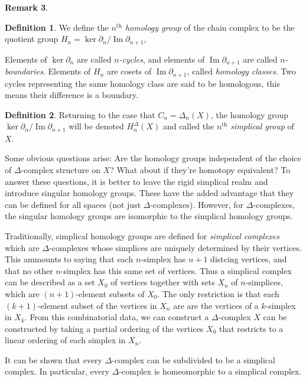\documentclass[11pt,a4paper]{article}
\theoremstyle{definition}
\newtheorem{definition}{Definition}[section]
\newtheorem{remark}[definition]{Remark}
\theoremstyle{plain}
\theoremstyle{remark}
\begin{document}
\begin{remark}
\begin{definition}
  We define the \emph{$n^\operatorname{th}$ homology group} of the chain complex 
  to be the quotient group $H_n = \ker \partial_n / \operatorname{Im} \partial_{n+1}$,
\end{definition}

Elements of $\ker \partial_n$ are called \emph{$n$-cycles}, and elements of $\operatorname{Im} \partial_{n+1}$ are called 
\emph{$n$-boundaries}. Elements of $H_n$ are cosets of $\operatorname{Im} \partial_{n+1}$, 
called \emph{homology classes}. Two cycles representing the same homology class are said to be 
homologous, this means their difference is a boundary. 

\begin{definition}
  Returning to the case that $C_n = \Delta_n (X)$, the homology group $\ker \partial_n / \operatorname{Im} \partial_{n+1}$ will 
  be denoted $H_n^\Delta (X)$ and called the \emph{$n^\operatorname{th}$ simplical group} of $X$. 
\end{definition}

Some obvious questions arise: Are the homology groups independent of the 
choice of $\Delta$-complex structure on $X$? What about if they're homotopy equivalent? 
To answer these questions, it is better to leave the rigid simplical realm and 
introduce singular homology groups. 
These have the added advantage that they can be defined for all spaces (not just $\Delta$-complexes). 
However, for $\Delta$-complexes, the singular homology groups are isomorphic to the simplical homology groups.

Traditionally, simplical homology groups are defined for \emph{simplical complexes} which are
$\Delta$-complexes whose simplices are uniquely determined by their vertices. 
This ammounts to saying that each $n$-simplex has $n+1$ distcing vertices, and that 
no other $n$-simplex has this same set of vertices. Thus a simplical complex can be described 
as a set $X_0$ of vertices together with sets $X_n$ of $n$-simplices, 
which are $(n+1)$-element subsets of $X_0$. 
The only restriction is that each $(k+1)$-element subset of the vertices in $X_n$ are 
are the vertices of a $k$-simplex in $X_k$. From this combinatorial data, we 
can construct a $\Delta$-complex $X$ can be constructed by taking a partial ordering of the vertices 
$X_0$ that restricts to a linear ordering of each simplex in $X_n$.

It can be shown that every $\Delta$-complex can be subdivided to be a simplical complex. 
In particular, every $\Delta$-complex is homeomorphic to a simplical complex. 


\end{remark}
\end{document}
